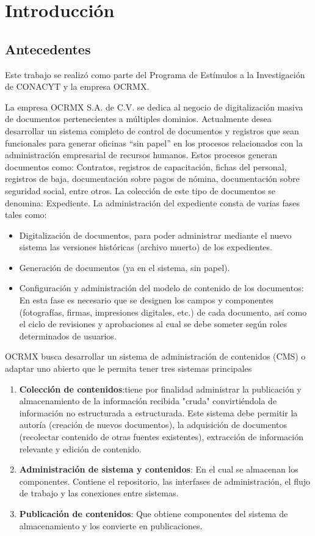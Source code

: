 \chapter{Introducción}
\label{ch:intro}


\section{Antecedentes}

Este trabajo se realizó como parte del Programa de Estímulos a la Investigación de CONACYT y la empresa   OCRMX. 

La empresa OCRMX S.A. de C.V. se dedica al negocio de digitalización masiva de documentos  pertenecientes a múltiples dominios.
Actualmente desea desarrollar un sistema completo de control de documentos y registros que sean funcionales para generar oficinas “sin papel” en los procesos relacionados con la administración empresarial de recursos humanos. Estos procesos generan documentos como: Contratos, registros de capacitación, fichas del personal, registros de baja, documentación sobre pagos de nómina, documentación sobre seguridad social, entre otros. La colección de este tipo de documentos se denomina: Expediente. La administración del expediente consta de varias fases tales como:
\begin{itemize}
 
\item	Digitalización de documentos, para poder administrar mediante el nuevo sistema las versiones históricas  (archivo muerto) de los expedientes.
\item	Generación de documentos (ya en el sistema, sin papel).
\item	Configuración y administración del modelo de contenido de los documentos: En esta fase es necesario que se designen los campos y componentes (fotografías, firmas, impresiones digitales, etc.) de cada documento, así como el ciclo de revisiones y aprobaciones al cual se debe someter según roles determinados de usuarios.
\end{itemize}

OCRMX busca  desarrollar un sistema de administración de contenidos (CMS) o adaptar uno abierto que le  permita tener tres sistemas principales 
\begin{enumerate}

\item 	\textbf{Colección de contenidos}:tiene por finalidad administrar la publicación y almacenamiento de la información recibida "cruda" convirtiéndola de información no estructurada a estructurada.  Este sistema debe permitir la autoría (creación de nuevos documentos), la adquisición de documentos (recolectar contenido de otras fuentes existentes), extracción de información relevante y edición de contenido. 
\item 	\textbf{Administración de sistema y contenidos}: En el cual se almacenan los componentes. Contiene el repositorio, las interfases de administración, el flujo de trabajo  y las conexiones entre sistemas.
\item 	\textbf{Publicación de contenidos}: Que obtiene componentes del sistema de almacenamiento y los convierte en publicaciones.
\end{enumerate}


